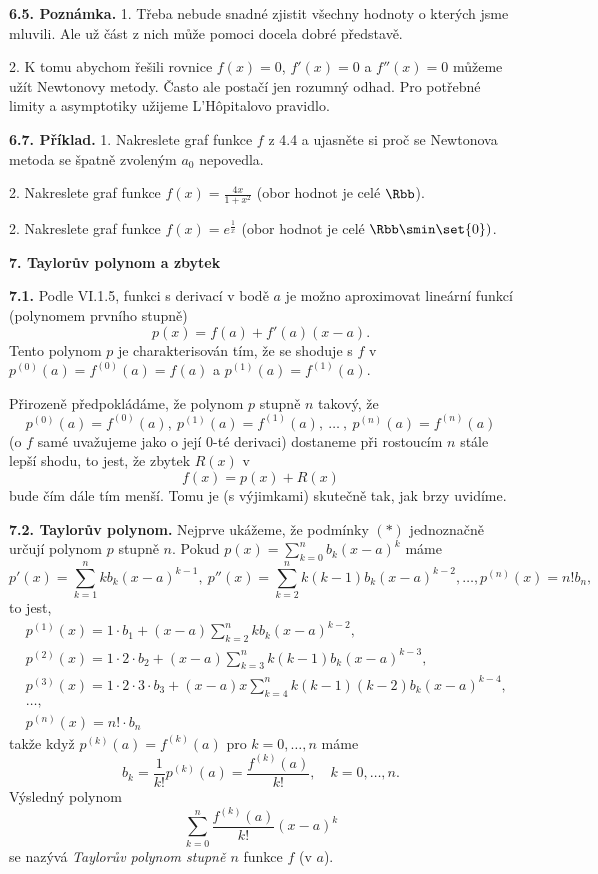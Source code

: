 \documentclass[12pt]{article}
\begin{document}
{ \bigskip
 
 {\bf 6.5. Poznámka.} 1. Třeba nebude snadné zjistit všechny hodnoty o kterých jsme mluvili. Ale už část z nich může pomoci docela dobré p\v redstav\v e. 
 
 2. K tomu abychom řešili rovnice $f(x)=0$, $f'(x)=0$ a
 $f''(x)=0$ můžeme užít Newtonovy metody. Často ale postačí jen rozumný odhad. Pro potřebné limity a asymptotiky užijeme 
 L'H\^{o}pitalovo pravidlo.
 
 \bigskip
 
 {\bf 6.7. Příklad.} 1. Nakreslete graf funkce $f$ z 4.4 a ujasněte si proč se Newtonova metoda se špatně zvoleným $a_0$ nepovedla.
 
 \smallskip
 
 2. Nakreslete graf funkce  $f(x)=\frac{4x}{1+x^2}$ (obor hodnot je celé $\Rbb$).
 
 \smallskip
 
 2. Nakreslete graf funkce  $f(x)= e^{\frac{1}{x}}$ (obor hodnot je celé  $\Rbb\smin\set{0})$.
 
 
 \vskip10mm
 
 
 {\large\bf 7. Taylorův polynom a zbytek}
 
 \bigskip
 
 {\bf 7.1.} Podle VI.1.5, funkci s derivací v bodě $a$ je možno aproximovat lineární funkcí (polynomem prvního stupně)
 $$
 p(x)=f(a)+f'(a)(x-a).
 $$
 Tento polynom $p$ je charakterisován tím, že se shoduje s $f$ v  $p^{(0)}(a)=f^{(0)}(a)=f(a)$ a $p^{(1)}(a)=f^{(1)}(a)$.
 
 Přirozeně předpokládáme, že polynom $p$ stupně $n$
takový, že
 \begin{equation}
 p^{(0)}(a)=f^{(0)}(a),\  p^{(1)}(a)=f^{(1)}(a),\ \dots\ ,\  p^{(n)}(a)=f^{(n)}(a) \tag{$*$}
 \end{equation}
 (o $f$ samé uvažujeme jako o její $0$-té derivaci) dostaneme při rostoucím $n$ stále lepší shodu, to jest, že zbytek $R(x)$ v
 $$
 f(x)=p(x)+R(x)
 $$
bude \v cím dále tím menší. Tomu je (s výjimkami) skutečně tak, jak brzy uvidíme.
 
 \bigskip
 
 {\bf 7.2. Taylorův polynom.} Nejprve ukážeme, že podmínky $(*)$ jednoznačně určují polynom $p$ stupně $n$. Pokud \hbox{$p(x)=\sum_{k=0}^nb_k(x-a)^k$}
 máme
 $$
 p'(x)=\sum_{k=1}^nkb_k(x-a)^{k-1},\ p''(x)=\sum_{k=2}^nk(k-1)b_k(x-a)^{k-2}, \dots,
 p^{(n)}(x)=n!b_n,
 $$
 to jest,
 $$
 \begin{aligned}
 &p^{(1)}(x)=1\cdot b_1+(x-a)\sum_{k=2}^nkb_k(x-a)^{k-2},\\
 &p^{(2)}(x)=1\cdot 2\cdot b_2+(x-a)\sum_{k=3}^nk(k-1)b_k(x-a)^{k-3},\\
 &p^{(3)}(x)=1\cdot 2\cdot 3\cdot b_3+(x-a)x\sum_{k=4}^nk(k-1)(k-2)b_k(x-a)^{k-4},\\
 &\dots,\\
 &p^{(n)}(x)=n!\cdot b_n
 \end{aligned}
 $$
 takže když $p^{(k)}(a)= f^{(k)}(a)$  pro $k=0,\dots,n$ máme
$$
 b_k=\frac{1}{k!}p^{(k)}(a)=\frac{f^{(k)}(a)}{k!}, \quad k=0,\dots,n.
 $$
 Výsledný polynom
 $$
 \sum_{k=0}^n\frac{f^{(k)}(a)}{k!}(x-a)^k
 $$
 se nazývá {\em Taylorův polynom stupně $n$} funkce $f$ (v $a$).
 
}
\end{document}
